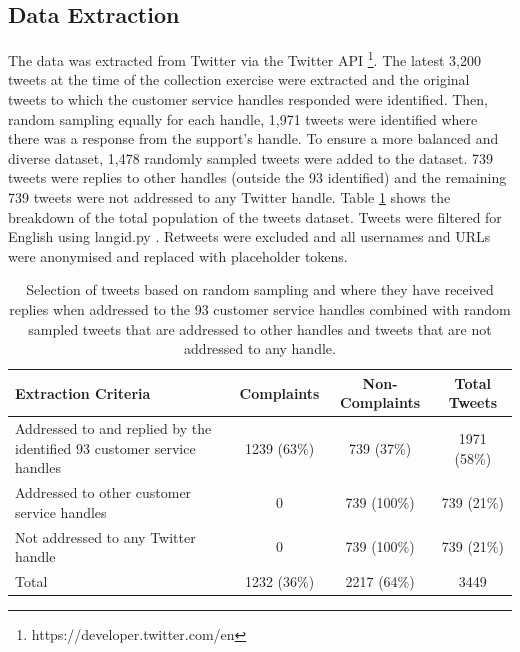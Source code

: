 \subsection{Data Extraction}
The data was extracted from Twitter via the Twitter API \footnote{https://developer.twitter.com/en}. The latest 3,200 tweets at the time of the collection exercise were extracted and the original tweets to which the customer service handles responded were identified. Then, random sampling equally for each handle, 1,971 tweets were identified where there was a response from the support's handle. To ensure a more balanced and diverse dataset, 1,478 randomly sampled tweets were added to the dataset. 739 tweets were replies to other handles (outside the 93 identified) and the remaining 739 tweets were not addressed to any Twitter handle. Table \ref{tab: tweet_counts} shows the breakdown of the total population of the tweets dataset. Tweets were filtered for English using langid.py \cite{luiLangidPyOfftheshelf2012}. Retweets were excluded and all usernames and URLs were anonymised and replaced with placeholder tokens.
\begin{table}[ht]
    \captionsetup{font=small}
    \centering
    \begin{tabularx}{\textwidth}{|X|c|c|c|}
        \hline
        \rowcolor[gray]{0.7}
        \textbf{Extraction Criteria}                                           & \textbf{Complaints} & \textbf{Non-Complaints} & \textbf{Total Tweets} \\
        \hline
        Addressed to and replied by the identified 93 customer service handles & 1239 \small{(63\%)} & 739 \small{(37\%)}      & 1971 \small{(58\%)}   \\
        \hline
        Addressed to other customer service handles                            & 0                   & 739 \small{(100\%)}     & 739 \small{(21\%)}    \\
        \hline
        Not addressed to any Twitter handle                                    & 0                   & 739 \small{(100\%)}     & 739 \small{(21\%)}    \\
        \hline
        \rowcolor[gray]{0.9}
        Total                                                                  & 1232 \small{(36\%)} & 2217 \small{(64\%)}     & 3449                  \\
        \hline
    \end{tabularx}
    \caption{Selection of tweets based on random sampling and where they have received replies when addressed to the 93 customer service handles combined with random sampled tweets that are addressed to other handles and tweets that are not addressed to any handle.}
    \label{tab: tweet_counts}
\end{table}

